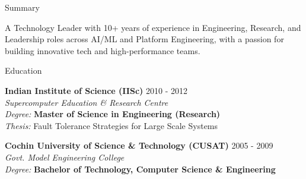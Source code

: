 \documentclass{resume} %
\begin{document}

\begin{rSection}{Summary}

A Technology Leader with 10+ years of experience in Engineering, Research, and Leadership roles across AI/ML and Platform Engineering, with a passion for building innovative tech and high-performance teams. 

\end{rSection}


\begin{rSection}{Education}

{\bf Indian Institute of Science (IISc)} \hfill {2010 - 2012} \\ 
{\em Supercomputer Education \& Research Centre} \smallskip \\
{\em Degree:} {\bf Master of Science in Engineering (Research)} \\
{\em Thesis:} Fault Tolerance Strategies for Large Scale Systems

{\bf Cochin University of Science \& Technology (CUSAT)} \hfill {2005 - 2009} \\
{\em Govt. Model Engineering College} \smallskip \\
{\em Degree:} {\bf Bachelor of Technology, Computer Science \& Engineering}

\end{rSection}

\end{document}
